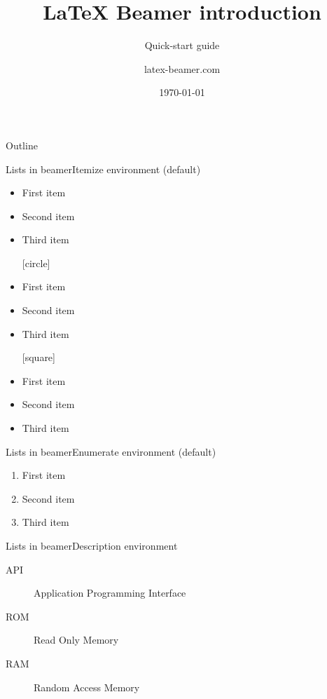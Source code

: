 \documentclass{beamer}
\title {\LaTeX{} Beamer introduction}
\subtitle{Quick-start guide}
\author{latex-beamer.com}
\institute{Online Education}
\date{\today}
\begin{document}
\begin{frame}
\titlepage
\end{frame}

\begin{frame}{Outline}
    \tableofcontents[hideallsubsections]
\end{frame}


\begin{frame}{Lists in beamer}{Itemize environment (default)}
  \begin{itemize}

    [default]
    \item First item
    \item Second item
    \item Third item
      
    [circle]
    \item First item
    \item Second item
    \item Third item
      
    [square]
    \item First item
    \item Second item
    \item Third item

\end{itemize}
\end{frame}

\begin{frame}{Lists in beamer}{Enumerate environment (default)}
\begin{enumerate}
    \item First item
    \item Second item
    \item Third item
\end{enumerate}
\end{frame}

\begin{frame}{Lists in beamer}{Description environment}
\begin{description}
    \item[API] Application Programming Interface
    \item[ROM] Read Only Memory
    \item[RAM] Random Access Memory
\end{description}
\end{frame}
\end{document}
